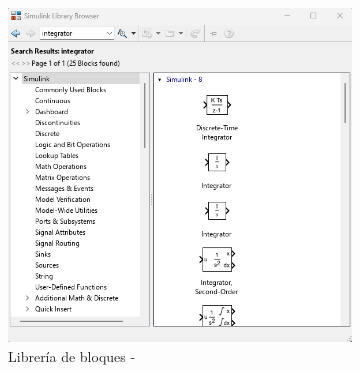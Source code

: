 \begin{figure}[htbp]
    \centering
    \begin{subfigure}[b]{0.35\textwidth}
        \centering
        \includegraphics[width=\textwidth]{fig/Capitulo5/Caso_de_estudio_PID/lib_integrator.png}
        \caption{Librería de bloques -}
        \label{fig:bias_sim}
    \end{subfigure}
    \hfill
    \begin{subfigure}[b]{0.45\textwidth}
        \centering

\end{subfigure}
\end{figure}
